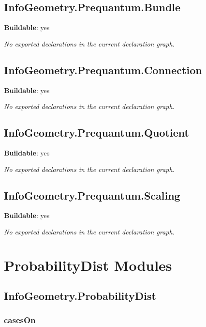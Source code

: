 \section{InfoGeometry.Prequantum.Bundle}

\noindent\textbf{Buildable}: yes

\noindent\emph{No exported declarations in the current declaration graph.}

\section{InfoGeometry.Prequantum.Connection}

\noindent\textbf{Buildable}: yes

\noindent\emph{No exported declarations in the current declaration graph.}

\section{InfoGeometry.Prequantum.Quotient}

\noindent\textbf{Buildable}: yes

\noindent\emph{No exported declarations in the current declaration graph.}

\section{InfoGeometry.Prequantum.Scaling}

\noindent\textbf{Buildable}: yes

\noindent\emph{No exported declarations in the current declaration graph.}

\chapter{ProbabilityDist Modules}

\section{InfoGeometry.ProbabilityDist}

\subsection*{casesOn}

\begin{theorem}[blueprint="infogeometry:probabilitydist:caseson"]
\end{theorem}

